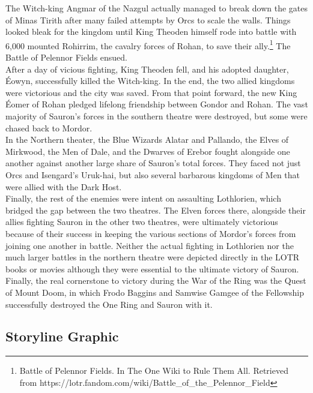 \documentclass[10pt, letterpaper]{article}
\begin{document}
\noindent The Witch-king Angmar of the Nazgul actually managed to break down the gates of Minas Tirith after many failed attempts by Orcs to scale the walls. Things looked bleak for the kingdom until King Theoden himself rode into battle with 6,000 mounted Rohirrim, the cavalry forces of Rohan, to save their ally.\footnote{Battle of Pelennor Fields. In The One Wiki to Rule Them All. Retrieved from https://lotr.fandom.com/wiki/Battle\_of\_the\_Pelennor\_Field} The Battle of Pelennor Fields ensued. \\

\noindent After a day of vicious fighting, King Theoden fell, and his adopted daughter, Éowyn, successfully killed the Witch-king. In the end, the two allied kingdoms were victorious and the city was saved. From that point forward, the new King Éomer of Rohan pledged lifelong friendship between Gondor and Rohan. The vast majority of Sauron’s forces in the southern theatre were destroyed, but some were chased back to Mordor. \\

\noindent In the Northern theater, the Blue Wizards Alatar and Pallando, the Elves of Mirkwood, the Men of Dale, and the Dwarves of Erebor fought alongside one another against another large share of Sauron's total forces. They faced not just Orcs and Isengard’s Uruk-hai, but also several barbarous kingdoms of Men that were allied with the Dark Host. \\

\noindent Finally, the rest of the enemies were intent on assaulting Lothlorien, which bridged the gap between the two theatres. The Elven forces there, alongside their allies fighting Sauron in the other two theatres, were ultimately victorious because of their success in keeping the various sections of Mordor’s forces from joining one another in battle. Neither the actual fighting in Lothlorien nor the much larger battles in the northern theatre were depicted directly in the LOTR books or movies although they were essential to the ultimate victory of Sauron. \\

\noindent Finally, the real cornerstone to victory during the War of the Ring was the Quest of Mount Doom, in which Frodo Baggins and Samwise Gamgee of the Fellowship successfully destroyed the One Ring and Sauron with it. \\

\subsection{Storyline Graphic\\} 
\end{document}
